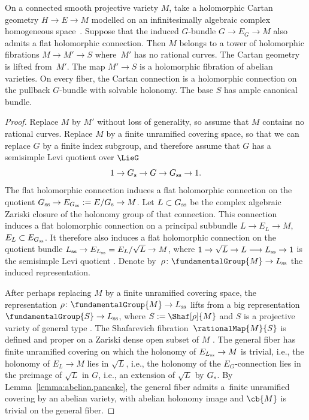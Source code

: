 \begin{Theorem}\label{theorem:JR}
On a connected smooth projective variety $M$, take a holomorphic Cartan geometry $H\to E \to M$ modelled on an infinitesimally algebraic complex homogeneous space~.
Suppose that the induced $G$-bundle $G \to E_G \to M$ also admits a flat holomorphic connection.
Then $M$ belongs to a tower of holomorphic fibrations $M \to M' \to S$ where~$M'$ has no rational curves.
The Cartan geometry is lifted from~$M'$.
The map $M' \to S$ is a holomorphic fibration of abelian varieties.
On every fiber, the Cartan connection is a holomorphic connection on the pullback $G$-bundle with solvable holonomy.
The base $S$ has ample canonical bundle.
\end{Theorem}

\begin{proof}
Replace $M$ by $M'$ without loss of generality, so assume that $M$ contains no rational curves.
Replace $M$ by a finite unramified covering space, so that we can replace $G$ by a finite index subgroup,
and therefore assume that $G$ has a semisimple Levi quotient over $\LieG$
\[
1 \to G_{\rm s} \to G \to G_{\rm ss} \to 1.
\]
The flat holomorphic connection induces a flat holomorphic connection on the quotient $G_{\rm ss} \to E_{G_{\rm ss}} :=
 E/G_{\rm s}\to M$.
Let $L \subset G_{\rm ss}$ be the complex algebraic Zariski closure of the holonomy group of that connection.
This connection induces a flat holomorphic connection on a principal subbundle $L\to E_L \to M$,
$E_L \subset E_{G_{\rm ss}}$.
It therefore also induces a flat holomorphic connection on the quotient bundle $L_{\rm ss} \to E_{L_{\rm ss}}
 = E_L/\sqrt{L} \to M$, where $1 \to \sqrt{L} \to L \longrightarrow
L_{\rm ss} \to 1$ is the semisimple Levi quotient \cite[Theorem 4.3]{Hochschild:1981}.
Denote by~${\rho \colon \fundamentalGroup{M} \to L_{\rm ss}}$ the induced representation.

After perhaps replacing $M$ by a finite unramified covering space, the representation $\rho \colon
\fundamentalGroup{M}\allowbreak\to L_{\rm ss}$ lifts from a big representation $\fundamentalGroup{S} \to L_{\rm ss}$,
where $S := \Shaf[\rho]{M}$ and $S$ is a projective variety of
general type \cite[Theorem 5 (and remarks following)]{Zuo:1999}.
The Shafarevich fibration~${\rationalMap{M}{S}}$ is defined and proper on a Zariski dense open subset of $M$
\cite[Theorem 4.1]{Kollar:1993}.
The general fiber has finite unramified covering on which the holonomy of $E_{L_{\rm ss}}\to M$ is trivial, i.e., the holonomy of $E_L \to M$ lies in $\sqrt{L}$, i.e., the holonomy of the $E_G$-connection lies in the preimage of $\sqrt{L}$ in $G$, i.e., an extension of $\sqrt{L}$ by $G_{\rm s}$.
By Lemma~\ref{lemma:abelian.pancake}, the general fiber admits a~finite unramified covering by an abelian variety, with abelian holonomy image and $\cb{M}$ is trivial on the general fiber.


\end{proof}
